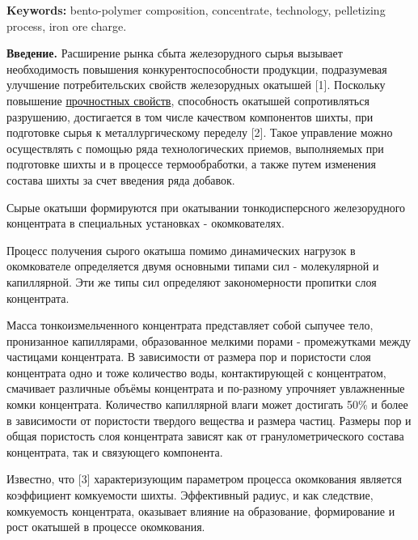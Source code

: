 {\bfseries Keywords:} bento-polymer composition, concentrate, technology,
pelletizing process, iron ore charge.
\vspace{-1em}
\begin{multicols}{2}
{\bfseries Введение.} Расширение рынка сбыта железорудного сырья вызывает
необходимость повышения конкурентоспособности продукции, подразумевая
улучшение потребительских свойств железорудных окатышей {[}1{]}.
Поскольку повышение
\href{https://www.yandex.ru/search/?text=\%D0\%BF\%D1\%80\%D0\%BE\%D1\%87\%D0\%BD\%D0\%BE\%D1\%81\%D1\%82\%D0\%BD\%D1\%8B\%D1\%85\%20\%D1\%81\%D0\%B2\%D0\%BE\%D0\%B9\%D1\%81\%D1\%82\%D0\%B2\%20\%20&lr=213&msid=1739867152.50217765.01245.11111&search_source=chromentp_desktop&suggest_reqid=163703149161131391771529680334996&msp=1}{прочностных свойств},
способность окатышей сопротивляться разрушению, достигается в том числе
качеством компонентов шихты, при подготовке сырья к металлургическому
переделу {[}2{]}. Такое управление можно осуществлять с помощью ряда
технологических приемов, выполняемых при подготовке шихты и в процессе
термообработки, а также путем изменения состава шихты за счет введения
ряда добавок.

Сырые окатыши формируются при окатывании тонкодисперсного железорудного
концентрата в специальных установках - окомкователях.

Процесс получения сырого окатыша помимо динамических нагрузок в
окомкователе определяется двумя основными типами сил - молекулярной и
капиллярной. Эти же типы сил определяют закономерности пропитки слоя
концентрата.

Масса тонкоизмельченного концентрата представляет собой сыпучее тело,
пронизанное капиллярами, образованное мелкими порами - промежутками
между частицами концентрата. В зависимости от размера пор и пористости
слоя концентрата одно и тоже количество воды, контактирующей с
концентратом, смачивает различные объёмы концентрата и по-разному
упрочняет увлажненные комки концентрата. Количество капиллярной влаги
может достигать 50\% и более в зависимости от пористости твердого
вещества и размера частиц. Размеры пор и общая пористость слоя
концентрата зависят как от гранулометрического состава концентрата, так
и связующего компонента.

Известно, что {[}3{]} характеризующим параметром процесса окомкования
является коэффициент комкуемости шихты. Эффективный радиус, и как
следствие, комкуемость концентрата, оказывает влияние на образование,
формирование и рост окатышей в процессе окомкования.


\end{multicols}
